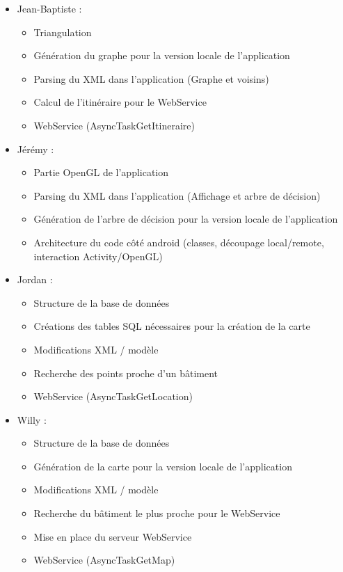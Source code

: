 
\renewcommand{\labelitemi}{$\bullet$}
\begin{itemize}
\item Jean-Baptiste :
\begin{itemize}
\item Triangulation
\item Génération du graphe pour la version locale de l'application
\item Parsing du XML dans l'application (Graphe et voisins)
\item Calcul de l'itinéraire pour le WebService
\item WebService (AsyncTaskGetItineraire)
\end{itemize}

\item Jérémy :
\begin{itemize}
\item Partie OpenGL de l'application
\item Parsing du XML dans l'application (Affichage et arbre de décision)
\item Génération de l'arbre de décision pour la version locale de l'application
\item Architecture du code côté android (classes, découpage local/remote, interaction Activity/OpenGL)
\end{itemize}

\item Jordan :
\begin{itemize}
\item Structure de la base de données
\item Créations des tables SQL nécessaires pour la création de la carte
\item Modifications XML / modèle
\item Recherche des points proche d'un bâtiment
\item WebService (AsyncTaskGetLocation)
\end{itemize}

\item Willy :
\begin{itemize}
\item Structure de la base de données
\item Génération de la carte pour la version locale de l'application
\item Modifications XML / modèle
\item Recherche du bâtiment le plus proche pour le WebService
\item Mise en place du serveur WebService
\item WebService (AsyncTaskGetMap)
\end{itemize}
\end{itemize}


